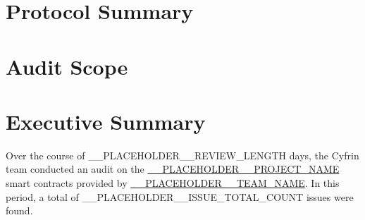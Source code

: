 \newcommand{\truncatehash}[1]{%
  \StrLeft{#1}{12}\ldots%
}

\hypertarget{protocol-summary}{%
\section{Protocol Summary}\label{protocol-summary}}



\hypertarget{audit-scope}{%
\section{Audit Scope}\label{audit-scope}}



\hypertarget{executive-summary}{%
\section{Executive Summary}\label{executive-summary}}

Over the course of __PLACEHOLDER__REVIEW_LENGTH days, the Cyfrin team conducted an audit on the
\href{__PLACEHOLDER__REPO_LINK}{__PLACEHOLDER__PROJECT_NAME}
smart contracts provided by
\href{__PLACEHOLDER__TEAM_WEBSITE}{__PLACEHOLDER__TEAM_NAME}.
In this period, a total of __PLACEHOLDER__ISSUE_TOTAL_COUNT issues were found.

\bigbreak


\vspace{1cm}

\renewcommand{\floatpagefraction}{.8}%
\renewcommand{\textfraction}{.1}%
\renewcommand{\topfraction}{.9}%
\renewcommand{\bottomfraction}{.9}%
\setcounter{topnumber}{2}
\setcounter{bottomnumber}{2}
\setcounter{totalnumber}{4}

